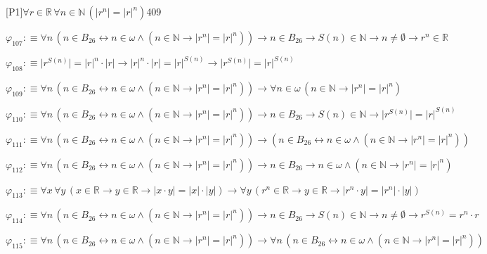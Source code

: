 \begin{fullproof}{[P1]}{$\forall r \in \mathbb{R}\,\forall n \in \mathbb{N}\,(\lvert {{r}^{n}} \rvert = {{\lvert r \rvert}^{n}})$}{409}
\begin{abbrevlist}
\item $\varphi_{107} :\equiv \forall n\,(n \in B_{26} \leftrightarrow n \in \omega \land (n \in \mathbb{N} \to \lvert {{r}^{n}} \rvert = {{\lvert r \rvert}^{n}})) \to n \in B_{26} \to S(n) \in \mathbb{N} \to n \neq \emptyset \to {{r}^{n}} \in \mathbb{R}$
\item $\varphi_{108} :\equiv \lvert {{r}^{S(n)}} \rvert = {{\lvert r \rvert}^{n}} \cdot \lvert r \rvert \to {{\lvert r \rvert}^{n}} \cdot \lvert r \rvert = {{\lvert r \rvert}^{S(n)}} \to \lvert {{r}^{S(n)}} \rvert = {{\lvert r \rvert}^{S(n)}}$
\item $\varphi_{109} :\equiv \forall n\,(n \in B_{26} \leftrightarrow n \in \omega \land (n \in \mathbb{N} \to \lvert {{r}^{n}} \rvert = {{\lvert r \rvert}^{n}})) \to \forall n \in \omega\,(n \in \mathbb{N} \to \lvert {{r}^{n}} \rvert = {{\lvert r \rvert}^{n}})$
\item $\varphi_{110} :\equiv \forall n\,(n \in B_{26} \leftrightarrow n \in \omega \land (n \in \mathbb{N} \to \lvert {{r}^{n}} \rvert = {{\lvert r \rvert}^{n}})) \to n \in B_{26} \to S(n) \in \mathbb{N} \to \lvert {{r}^{S(n)}} \rvert = {{\lvert r \rvert}^{S(n)}}$
\item $\varphi_{111} :\equiv \forall n\,(n \in B_{26} \leftrightarrow n \in \omega \land (n \in \mathbb{N} \to \lvert {{r}^{n}} \rvert = {{\lvert r \rvert}^{n}})) \to (n \in B_{26} \leftrightarrow n \in \omega \land (n \in \mathbb{N} \to \lvert {{r}^{n}} \rvert = {{\lvert r \rvert}^{n}}))$
\item $\varphi_{112} :\equiv \forall n\,(n \in B_{26} \leftrightarrow n \in \omega \land (n \in \mathbb{N} \to \lvert {{r}^{n}} \rvert = {{\lvert r \rvert}^{n}})) \to n \in B_{26} \to n \in \omega \land (n \in \mathbb{N} \to \lvert {{r}^{n}} \rvert = {{\lvert r \rvert}^{n}})$
\item $\varphi_{113} :\equiv \forall x\,\forall y\,(x \in \mathbb{R} \to y \in \mathbb{R} \to \lvert x \cdot y \rvert = \lvert x \rvert \cdot \lvert y \rvert) \to \forall y\,({{r}^{n}} \in \mathbb{R} \to y \in \mathbb{R} \to \lvert {{r}^{n}} \cdot y \rvert = \lvert {{r}^{n}} \rvert \cdot \lvert y \rvert)$
\item $\varphi_{114} :\equiv \forall n\,(n \in B_{26} \leftrightarrow n \in \omega \land (n \in \mathbb{N} \to \lvert {{r}^{n}} \rvert = {{\lvert r \rvert}^{n}})) \to n \in B_{26} \to S(n) \in \mathbb{N} \to n \neq \emptyset \to {{r}^{S(n)}} = {{r}^{n}} \cdot r$
\item $\varphi_{115} :\equiv \forall n\,(n \in B_{26} \leftrightarrow n \in \omega \land (n \in \mathbb{N} \to \lvert {{r}^{n}} \rvert = {{\lvert r \rvert}^{n}})) \to \forall n\,(n \in B_{26} \leftrightarrow n \in \omega \land (n \in \mathbb{N} \to \lvert {{r}^{n}} \rvert = {{\lvert r \rvert}^{n}}))$

\end{abbrevlist}
\end{fullproof}
